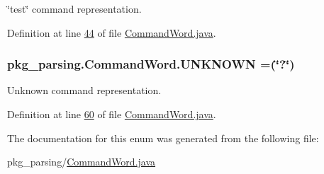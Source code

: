 \char`\"{}test\char`\"{} command representation. 



Definition at line \hyperlink{CommandWord_8java_source_l00044}{44} of file \hyperlink{CommandWord_8java_source}{Command\-Word.\-java}.

\hypertarget{enumpkg__parsing_1_1CommandWord_a7a089aad12d2934da530b785a3daab49}{
\subsubsection[{U\-N\-K\-N\-O\-W\-N}]{\setlength{\rightskip}{0pt plus 5cm}pkg\-\_\-parsing.\-Command\-Word.\-U\-N\-K\-N\-O\-W\-N =(\char`\"{}?\char`\"{})}}\label{enumpkg__parsing_1_1CommandWord_a7a089aad12d2934da530b785a3daab49}


Unknown command representation. 



Definition at line \hyperlink{CommandWord_8java_source_l00060}{60} of file \hyperlink{CommandWord_8java_source}{Command\-Word.\-java}.



The documentation for this enum was generated from the following file\-:\begin{DoxyCompactItemize}
\item 
pkg\-\_\-parsing/\hyperlink{CommandWord_8java}{Command\-Word.\-java}\end{DoxyCompactItemize}
